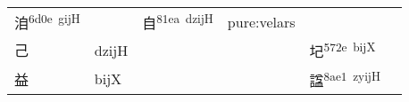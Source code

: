 \documentclass[14pt,a4paper]{scrartcl}
\begin{document}
\begin{longtable}[c]{@{}llllll@{}}
\begin{minipage}[t]{0.14\columnwidth}
洎\textsuperscript{6d0e~gijH}
\strut\end{minipage} &
\begin{minipage}[t]{0.14\columnwidth}\raggedright\strut
\strut\end{minipage} &
\begin{minipage}[t]{0.14\columnwidth}\raggedright\strut
自\textsuperscript{81ea~dzijH}
\strut\end{minipage} &
\begin{minipage}[t]{0.14\columnwidth}\raggedright\strut
pure:velars
\strut\end{minipage}\tabularnewline
\begin{minipage}[t]{0.14\columnwidth}\raggedright\strut
己
\strut\end{minipage} &
\begin{minipage}[t]{0.14\columnwidth}\raggedright\strut
dzijH
\strut\end{minipage} &
\begin{minipage}[t]{0.14\columnwidth}\raggedright\strut
\strut\end{minipage} &
\begin{minipage}[t]{0.14\columnwidth}\raggedright\strut
\strut\end{minipage} &
\begin{minipage}[t]{0.14\columnwidth}\raggedright\strut
圮\textsuperscript{572e~bijX}
\strut\end{minipage} &
\begin{minipage}[t]{0.14\columnwidth}\raggedright\strut
\strut\end{minipage}\tabularnewline
\begin{minipage}[t]{0.14\columnwidth}\raggedright\strut
益
\strut\end{minipage} &
\begin{minipage}[t]{0.14\columnwidth}\raggedright\strut
bijX
\strut\end{minipage} &
\begin{minipage}[t]{0.14\columnwidth}\raggedright\strut
\strut\end{minipage} &
\begin{minipage}[t]{0.14\columnwidth}\raggedright\strut
\strut\end{minipage} &
\begin{minipage}[t]{0.14\columnwidth}\raggedright\strut
諡\textsuperscript{8ae1~zyijH}
\strut\end{minipage} &
\begin{minipage}[t]{0.14\columnwidth}\raggedright\strut
\strut\end{minipage}\tabularnewline
\bottomrule
\end{longtable}
\end{document}
